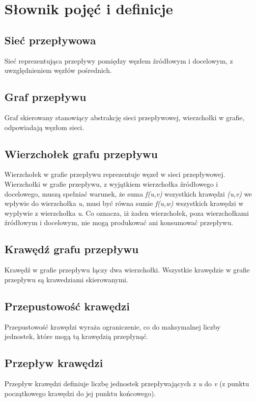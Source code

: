 \documentclass[10pt]{minutes}
\begin{document}
\begin{enumerate}
{{{\end{enumerate}

\section{Słownik pojęć i definicje}
\subsection{Sieć przepływowa}
Sieć reprezentująca przepływy pomiędzy węzłem źródłowym i docelowym, z uwzględnieniem węzłów pośrednich.
\subsection{Graf przepływu}
Graf skierowany stanowiący abstrakcję sieci przepływowej, wierzchołki w grafie, odpowiadają węzłom sieci.
\subsection{Wierzchołek grafu przepływu}
Wierzchołek w grafie przepływu reprezentuje węzeł w sieci przepływowej. Wierzchołki w grafie przepływu, z wyjątkiem wierzchołka źródłowego i docelowego, muszą spełniać warunek, że suma \emph{f(u,v)} wszystkich krawędzi \emph{(u,v)} we wpływie do wierzchołka \emph{u}, musi być równa sumie \emph{f(u,w)} wszystkich krawędzi w wypływie z wierzchołka \emph{u}. Co oznacza, iż żaden wierzchołek, poza wierzchołkami źródłowym i docelowym, nie mogą produkować ani konsumować przepływu.
\subsection{Krawędź grafu przepływu}
Krawędź w grafie przepływu łączy dwa wierzchołki. Wszystkie krawędzie w grafie przepływu są krawedziami skierowanymi.
\subsection{Przepustowość krawędzi}
Przepustowość krawędzi wyraża ograniczenie, co do maksymalnej liczby jednostek, które mogą tą krawędzią przepłynąć.
\subsection{Przepływ krawędzi}
Przepływ krawędzi definiuje liczbę jednostek przepływających z \emph{u} do \emph{v} (z punktu początkowego krawędzi do jej punktu końcowego).
\end{document}
